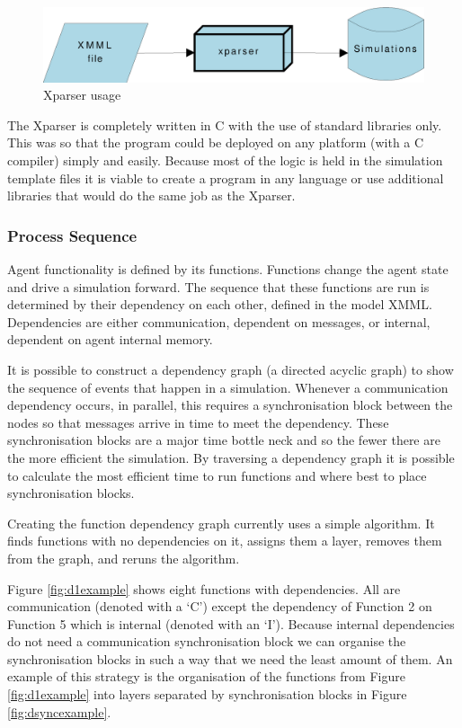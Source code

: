 \documentclass[a4paper,11pt]{article}
\begin{document}
\begin{figure}[!htb]
\begin{center}
\includegraphics*[scale=0.5]{xparser.eps}
\caption{Xparser usage}
\label{fig:xparser}
\end{center}
\end{figure}

The Xparser is completely written in C with the use of standard libraries only. This was so that the program could be deployed on any platform (with a C compiler) simply and easily. Because most of the logic is held in the simulation template files it is viable to create a program in any language or use additional libraries that would do the same job as the Xparser.

\subsubsection{Process Sequence}

Agent functionality is defined by its functions. Functions change
the agent state and drive a simulation forward. The sequence that
these functions are run is determined by their dependency on each
other, defined in the model XMML. Dependencies are either
communication, dependent on messages, or internal, dependent on
agent internal memory.

It is possible to construct a dependency graph (a directed acyclic
graph) to show the sequence of events that happen in a simulation.
Whenever a communication dependency occurs, in parallel, this
requires a synchronisation block between the nodes so that messages
arrive in time to meet the dependency. These synchronisation blocks
are a major time bottle neck and so the fewer there are the more
efficient the simulation. By traversing a dependency graph it is
possible to calculate the most efficient time to run functions and
where best to place synchronisation blocks.

Creating the function dependency graph currently uses a simple
algorithm. It finds functions with no dependencies on it, assigns
them a layer, removes them from the graph, and reruns the algorithm.

Figure \ref{fig:d1example} shows eight functions with dependencies. All are
communication (denoted with a `C') except the dependency of
Function 2 on Function 5 which is internal (denoted with an
`I'). Because internal dependencies do not need a
communication synchronisation block we can organise the
synchronisation blocks in such a way that we need the least amount of
them. An example of this strategy is the organisation of the functions from Figure \ref{fig:d1example} into layers separated by synchronisation blocks in Figure \ref{fig:dsyncexample}.
\end{document}
